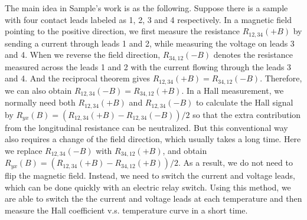 The main idea in Sample's work\cite{Sample1987} is as the following. Suppose there is a sample with four contact leads labeled as 1, 2, 3 and 4 respectively. In a magnetic field pointing to the positive direction, we first measure the resistance $R_{12, 34} (+B)$ by sending a current through leads 1 and 2, while measuring the voltage on leads 3 and 4. When we reverse the field direction, $R_{34, 12} (-B)$ denotes the resistance measured across the leads 1 and 2 with the current flowing through the leads 3 and 4. And the reciprocal theorem gives $R_{12, 34} (+B) = R_{34, 12} (-B)$. Therefore, we can also obtain $R_{12, 34} (-B) = R_{34, 12} (+B)$. In a Hall measurement, we normally need both $R_{12, 34} (+B)$ and $R_{12, 34} (-B)$ to calculate the Hall signal by $R_{yx} (B) = (R_{12, 34} (+B) - R_{12, 34} (-B))/2$ so that the extra contribution from the longitudinal resistance can be neutralized. But this conventional way also requires a change of the field direction, which usually takes a long time. Here we replace $R_{12, 34} (-B)$ with $R_{34, 12} (+B)$, and obtain $R_{yx} (B) = (R_{12, 34} (+B) - R_{34, 12} (+B))/2$. As a result, we do not need to flip the magnetic field. Instead, we need to switch the current and voltage leads, which can be done quickly with an electric relay switch. Using this method, we are able to switch the the current and voltage leads at each temperature and then measure the Hall coefficient v.s. temperature curve in a short time. 
